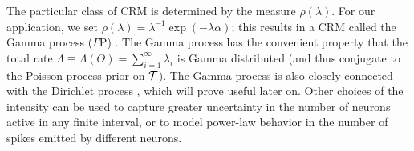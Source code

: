 The particular class of CRM is determined by the \Levy measure $\rho(\lambda)$. For our application, we set $\rho(\lambda) = \lambda^{-1}\exp(-\lambda\alpha)$;
this results in a CRM called the Gamma process ($\Gamma$P) \citep{applebaum2004}. 
The Gamma process has the convenient property that the 
total rate $\Lambda \equiv \Lambda(\Theta) = \sum_{i=1}^{\infty} \lambda_i$ is Gamma distributed (and thus conjugate to the Poisson process prior on $\mathcal{T}$).
The Gamma process is also closely connected with the Dirichlet process \citep{Ferguson73}, which will prove useful
later on.
Other choices of the \Levy intensity can be used to capture greater uncertainty in the number of neurons active in any finite interval, or to model
power-law behavior in the number of spikes emitted by different neurons.

